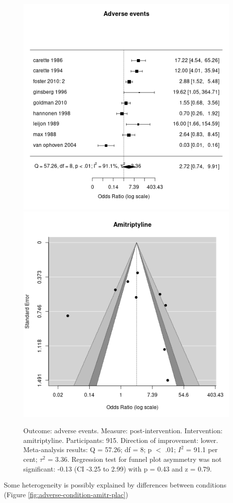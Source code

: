 \documentclass{report}\usepackage[]{graphicx}\usepackage[]{color}
\newenvironment{knitrout}{}{} %
\begin{document}
\begin{figure}

\begin{knitrout}
\color{fgcolor}
\includegraphics[width=0.5\linewidth,height=0.35\textheight]{img/adverse-amitriptyline- - -forest} 
\includegraphics[width=0.5\linewidth,height=0.35\textheight]{img/adverse-amitriptyline- - -funnel} 
\end{knitrout}

\caption[Adverse events: amitriptyline]{Outcome: adverse events. Measure: post-intervention. Intervention: amitriptyline. Participants: 915. Direction of improvement: lower. Meta-analysis results: Q = 57.26; df = 8; p $<$ .01; $I^2$ = 91.1 per cent; $\tau^2$ = 3.36. Regression test for funnel plot asymmetry was not significant: -0.13 (CI -3.25 to 2.99) with p = 0.43 and z = 0.79.}
\label{fig:adverse-amitrip}
\end{figure}


Some heterogeneity is possibly explained by differences between conditions (Figure \ref{fig:adverse-condition-amitr-plac})
\end{document}
